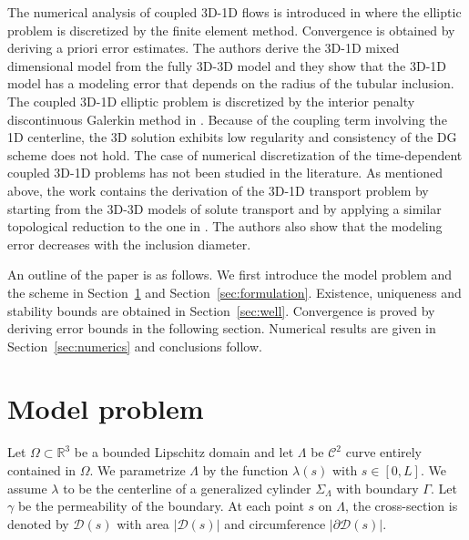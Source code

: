 \documentclass[pdflatex,sn-mathphys-num]{sn-jnl}%
\theoremstyle{thmstyleone}%
\theoremstyle{thmstyletwo}%
\theoremstyle{thmstylethree}%
\begin{document}
The numerical analysis of coupled 3D-1D flows is introduced in \cite{Zunino19} where the elliptic problem is discretized by the finite element method. Convergence is obtained by deriving a priori error estimates.  The authors derive the 3D-1D mixed dimensional model from
the fully 3D-3D model and they show that the 3D-1D model has a modeling error that depends on the radius of the tubular inclusion.  The coupled 3D-1D elliptic problem is discretized by the interior penalty discontinuous Galerkin method in \cite{Masri24}. Because of the coupling term involving the 1D centerline, the 3D solution exhibits low regularity and consistency of the DG scheme does not hold.
The case of numerical discretization of the time-dependent coupled 3D-1D problems has not been studied in the literature. As mentioned above, the work \cite{masri2024modelling}  contains the derivation of the 3D-1D transport problem by starting from the 3D-3D models of solute transport and by applying a similar topological reduction to the one in \cite{Zunino19}.  The authors also show that the modeling error decreases with the inclusion diameter.



An outline of the paper is as follows. We first introduce the model problem and the scheme in Section~\ref{sec:model} and Section~\ref{sec:formulation}. Existence, uniqueness
and stability bounds are obtained in Section~\ref{sec:well}.  Convergence is proved by deriving error bounds in the following section.  Numerical results are given in Section~\ref{sec:numerics} and conclusions follow.


\section{Model problem}
\label{sec:model}
\noindent Let $\Omega\subset\mathbb{R}^3$ be a bounded Lipschitz domain and let $\Lambda$ be $\mathcal{C}^2$ curve entirely contained in $\Omega$. We parametrize  $\Lambda$ by the function $\lambda(s)$ with $s\in[0,L]$.  We assume $\lambda$ to be the centerline of a generalized cylinder $\Sigma_\Lambda$ with boundary $\Gamma$. Let $\gamma$ be the permeability of the boundary. 
At each point $s$ on $\Lambda$, the cross-section is denoted by $\mathcal{D}(s)$ with  area $|\mathcal{D}(s)|$ and circumference $|\partial\mathcal{D}(s)|$. 
\end{document}
